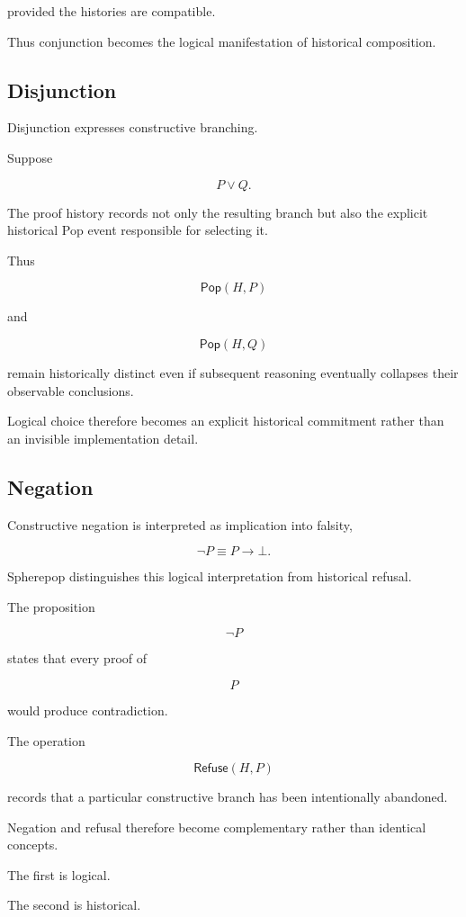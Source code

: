 \documentclass[12pt,oneside]{article}
\theoremstyle{definition}
\theoremstyle{remark}
\newcommand{\Pop}{\mathsf{Pop}}
\newcommand{\Refuse}{\mathsf{Refuse}}
\begin{document}
provided the histories are compatible.

Thus conjunction becomes the logical manifestation of historical composition.

\subsection{Disjunction}

Disjunction expresses constructive branching.

Suppose

\[
P
\lor
Q.
\]

The proof history records not only the resulting branch but also the explicit
historical Pop event responsible for selecting it.

Thus

\[
\Pop(H,P)
\]

and

\[
\Pop(H,Q)
\]

remain historically distinct even if subsequent reasoning eventually collapses
their observable conclusions.

Logical choice therefore becomes an explicit historical commitment rather than
an invisible implementation detail.

\subsection{Negation}

Constructive negation is interpreted as implication into falsity,

\[
\neg P
\equiv
P
\rightarrow
\bot.
\]

Spherepop distinguishes this logical interpretation from historical refusal.

The proposition

\[
\neg P
\]

states that every proof of

\[
P
\]

would produce contradiction.

The operation

\[
\Refuse(H,P)
\]

records that a particular constructive branch has been intentionally abandoned.

Negation and refusal therefore become complementary rather than identical
concepts.

The first is logical.

The second is historical.
\end{document}
